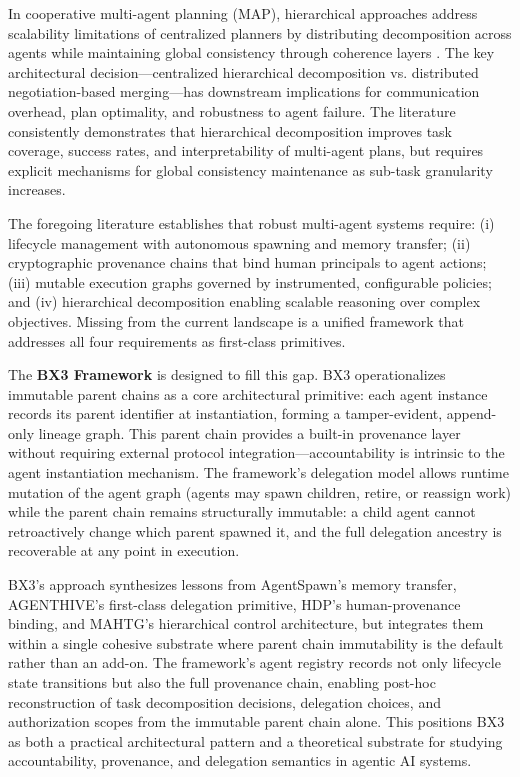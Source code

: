 In cooperative multi-agent planning (MAP), hierarchical approaches address scalability limitations of centralized planners by distributing decomposition across agents while maintaining global consistency through coherence layers \cite{map_survey_2017}. The key architectural decision—centralized hierarchical decomposition vs. distributed negotiation-based merging—has downstream implications for communication overhead, plan optimality, and robustness to agent failure. The literature consistently demonstrates that hierarchical decomposition improves task coverage, success rates, and interpretability of multi-agent plans, but requires explicit mechanisms for global consistency maintenance as sub-task granularity increases.


The foregoing literature establishes that robust multi-agent systems require: (i) lifecycle management with autonomous spawning and memory transfer; (ii) cryptographic provenance chains that bind human principals to agent actions; (iii) mutable execution graphs governed by instrumented, configurable policies; and (iv) hierarchical decomposition enabling scalable reasoning over complex objectives. Missing from the current landscape is a unified framework that addresses all four requirements as first-class primitives.

The \textbf{BX3 Framework} is designed to fill this gap. BX3 operationalizes immutable parent chains as a core architectural primitive: each agent instance records its parent identifier at instantiation, forming a tamper-evident, append-only lineage graph. This parent chain provides a built-in provenance layer without requiring external protocol integration—accountability is intrinsic to the agent instantiation mechanism. The framework's delegation model allows runtime mutation of the agent graph (agents may spawn children, retire, or reassign work) while the parent chain remains structurally immutable: a child agent cannot retroactively change which parent spawned it, and the full delegation ancestry is recoverable at any point in execution.

BX3's approach synthesizes lessons from AgentSpawn's memory transfer, AGENTHIVE's first-class delegation primitive, HDP's human-provenance binding, and MAHTG's hierarchical control architecture, but integrates them within a single cohesive substrate where parent chain immutability is the default rather than an add-on. The framework's agent registry records not only lifecycle state transitions but also the full provenance chain, enabling post-hoc reconstruction of task decomposition decisions, delegation choices, and authorization scopes from the immutable parent chain alone. This positions BX3 as both a practical architectural pattern and a theoretical substrate for studying accountability, provenance, and delegation semantics in agentic AI systems.

